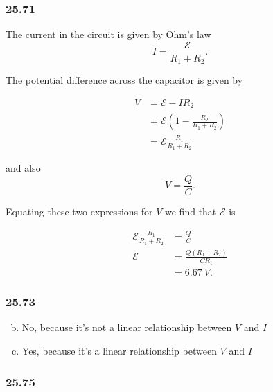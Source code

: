 \documentclass{article}
\begin{document}
\subsubsection{25.71}

The current in the circuit is given by Ohm's law \[I = \frac{\mathcal{E}}{R_1 + R_2}.\]

The potential difference across the capacitor is given by

\begin{align*}
  V & = \mathcal{E} - I R_2                                  \\
    & = \mathcal{E} \left( 1 - \frac{R_2}{R_1 + R_2} \right) \\
    & = \mathcal{E} \frac{R_1}{R_1 + R_2}
\end{align*}

and also \[V = \frac{Q}{C}.\]

Equating these two expressions for $V$ we find that $\mathcal{E}$ is

\begin{align*}
  \mathcal{E} \frac{R_1}{R_1 + R_2} & = \frac{Q}{C}                 \\
  \mathcal{E}                       & = \frac{Q (R_1 + R_2)}{C R_1} \\
                                    & = \qty{6.67}{V}.
\end{align*}

\subsubsection{25.73}

\begin{enumerate}[(a)]
  \setcounter{enumi}{1}
  \item No, because it's not a linear relationship between $V$ and $I$

  \item Yes, because it's a linear relationship between $V$ and $I$
\end{enumerate}

\subsubsection{25.75}
\end{document}
